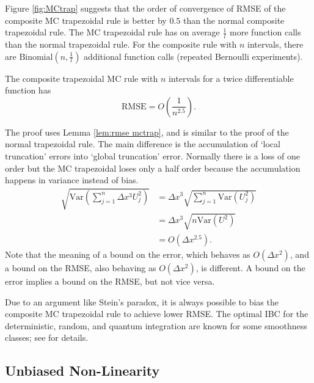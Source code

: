 \documentclass[a4paper,12pt]{article}
\begin{document}
Figure \ref{fig:MCtrap} suggests that the order of convergence of RMSE of the
composite MC trapezoidal rule is better by $0.5$ than the normal composite trapezoidal rule.
The MC trapezoidal rule has on average $\frac{1}{l}$ more function calls than
the normal trapezoidal rule. For the composite rule with $n$ intervals,
there are $\text{Binomial}(n,\frac{1}{l})$ additional function calls
(repeated Bernoulli experiments).\\

\begin{theorem} \label{thrm:order trap}
  The composite trapezoidal MC rule  with $n$ intervals
  for a twice differentiable function has
  \begin{equation}
    \text{RMSE} =O\left(\frac{1}{n^{2.5}} \right) .
  \end{equation}
\end{theorem}

The proof uses Lemma \ref{lem:rmse mctrap},
and is similar to the proof of the normal
trapezoidal rule. The main difference is the
accumulation of \enquote*{local truncation} errors into \enquote*{global truncation} error.
Normally there is a loss of one order but the MC trapezoidal loses only a half order
because the accumulation happens in variance instead of bias.
\begin{align}
  \sqrt{\text{Var}\left(\sum_{j=1}^{n}  \Delta x^{3}U_{j}^{2}\right)}
   & = \Delta x^{3} \sqrt{ \sum_{j=1}^{n}\text{Var} (U_{j}^{2})} \\
   & = \Delta x^{3} \sqrt{ n \text{Var}(U^{2})}                  \\
   & = O( \Delta x^{2.5}).
\end{align}
Note that the meaning of a bound on the error, which behaves as $O(\Delta x^{2})$,
and a bound on the RMSE, also behaving as $O(\Delta x^{2})$, is different.
A bound on the error implies a bound on the RMSE, but not vice versa.

\begin{related}
  Due to an argument like Stein's paradox,
  it is always possible to bias the composite MC trapezoidal
  rule to achieve lower RMSE.
  The optimal IBC for the deterministic, random, and quantum integration are known
  for some smoothness classes; see \cite{heinrich_optimal_2001} for details.
\end{related}


\subsection{Unbiased Non-Linearity}
\end{document}
